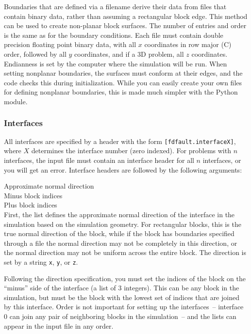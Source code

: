 \documentclass[12pt]{article}   	%
\begin{document}
Boundaries that are defined via a filename derive their data from files that contain binary data, rather than assuming a rectangular block edge. This method can be used to create non-planar block surfaces. The number of entries and order is the same as for the boundary conditions. Each file must contain double precision floating point binary data, with all $x$ coordinates in row major (C) order, followed by all $y$ coordinates, and if a 3D problem, all $z$ coordinates. Endianness is set by the computer where the simulation will be run. When setting nonplanar boundaries, the surfaces must conform at their edges, and the code checks this during initialization. While you can easily create your own files for defining nonplanar boundaries, this is made much simpler with the Python module.

\subsubsection{Interfaces}

All interfaces are specified by a header with the form {\tt [fdfault.interfaceX]}, where $X$ determines the interface number (zero indexed). For problems with $n$ interfaces, the input file must contain an interface header for all $n$ interfaces, or you will get an error. Interface headers are followed by the following arguments:

\vspace{0.1in}
\indent Approximate normal direction \\
\indent Minus block indices \\
\indent Plus block indices \\

\vspace{0.1in}
\noindent First, the list defines the approximate normal direction of the interface in the simulation based on the simulation geometry. For rectangular blocks, this is the true normal direction of the block, while if the block has boundaries specified through a file the normal direction may not be completely in this direction, or the normal direction may not be uniform across the entire block. The direction is set by a string {\tt x}, {\tt y}, or {\tt z}.

Following the direction specification, you must set the indices of the block on the ``minus'' side of the interface (a list of 3 integers). This can be any block in the simulation, but must be the block with the lowest set of indices that are joined by this interface. Order is not important for setting up the interfaces~-- interface 0 can join any pair of neighboring blocks in the simulation~-- and the lists can appear in the input file in any order.
\end{document}
